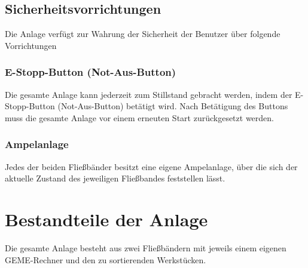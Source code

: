 \documentclass[oneside,a4paper,titlepage]{scrartcl} %
\begin{document}
\subsection{Sicherheitsvorrichtungen}
Die Anlage verfügt zur Wahrung der Sicherheit der Benutzer über folgende Vorrichtungen
\subsubsection{E-Stopp-Button (Not-Aus-Button)}
Die gesamte Anlage kann jederzeit zum Stillstand gebracht werden, indem der E-Stopp-Button (Not-Aus-Button) betätigt wird.\newline
Nach Betätigung des Buttons muss die gesamte Anlage vor einem erneuten Start zurückgesetzt werden.
\subsubsection{Ampelanlage}
Jedes der beiden Fließbänder besitzt eine eigene Ampelanlage, über die sich der aktuelle Zustand des jeweiligen Fließbandes feststellen lässt.

\newpage

\section{Bestandteile der Anlage}
Die gesamte Anlage besteht aus zwei Fließbändern mit jeweils einem eigenen GEME-Rechner und den zu sortierenden Werkstücken.
\end{document}

